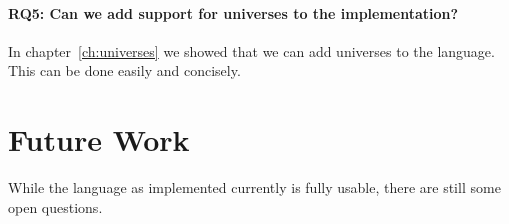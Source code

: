 \paragraph{RQ5: Can we add support for universes to the implementation?}
In chapter~\ref{ch:universes} we showed that we can add universes to the language. This can be done easily and concisely.

\section{Future Work}
While the language as implemented currently is fully usable, there are still some open questions. 